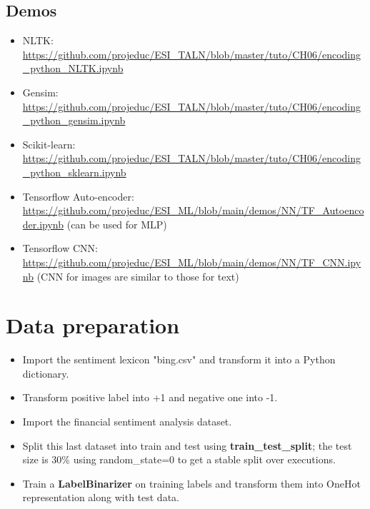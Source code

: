\documentclass{../extra/aakpract/aakpract}
\begin{document}

\subsection{Demos}

\begin{itemize}
	\item NLTK: \url{https://github.com/projeduc/ESI_TALN/blob/master/tuto/CH06/encoding_python_NLTK.ipynb}
	\item Gensim: \url{https://github.com/projeduc/ESI_TALN/blob/master/tuto/CH06/encoding_python_gensim.ipynb}
	\item Scikit-learn: \url{https://github.com/projeduc/ESI_TALN/blob/master/tuto/CH06/encoding_python_sklearn.ipynb}
	\item Tensorflow Auto-encoder: \url{https://github.com/projeduc/ESI_ML/blob/main/demos/NN/TF_Autoencoder.ipynb} (can be used for MLP)
	\item Tensorflow CNN: \url{https://github.com/projeduc/ESI_ML/blob/main/demos/NN/TF_CNN.ipynb} (CNN for images are similar to those for text)
\end{itemize}


\section{Data preparation}

\begin{itemize}
	\item Import the sentiment lexicon "bing.csv" and transform it into a Python dictionary.
	\item Transform positive label into +1 and negative one into -1.
	\item Import the financial sentiment analysis dataset.
	\item Split this last dataset into train and test using \textbf{train\_test\_split}; the test size is 30\% using random\_state=0 to get a stable split over executions.
	\item Train a \textbf{LabelBinarizer} on training labels and transform them into OneHot representation along with test data.
\end{itemize}
\end{document}
